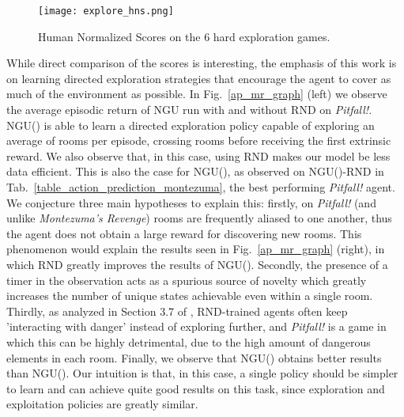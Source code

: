 \documentclass{article} \usepackage{iclr2020_conference,times}
\begin{document}
\begin{figure}
    \centering
    \texttt{[image: explore\_hns.png]} 
    \vspace{-2ex}
    \caption{Human Normalized Scores on the 6 hard exploration games.} 
    \label{hard_explore_hns_graph}
\vspace{-1ex}
\end{figure}

While direct comparison of the scores is interesting, the emphasis of this work is on learning directed exploration strategies that encourage the agent to cover as much of the environment as possible.
In Fig.~\ref{ap_mr_graph} (left) we observe the average episodic return of NGU run with and without RND on \textit{Pitfall!}. NGU() is able to learn a directed exploration policy capable of exploring an average of  rooms per episode, crossing  rooms before receiving the first extrinsic reward. We also observe that, in this case, using RND makes our model be less data efficient. This is also the case for NGU(), as observed on NGU()-RND in  Tab.~\ref{table_action_prediction_montezuma}, the best performing \textit{Pitfall!} agent. We conjecture three main hypotheses to explain this: firstly, on \textit{Pitfall!} (and unlike \textit{Montezuma's Revenge}) rooms are frequently aliased to one another, thus the agent does not obtain a large reward for discovering new rooms. This phenomenon would explain the results seen in Fig.~\ref{ap_mr_graph} (right), in which RND greatly improves the results of NGU(). Secondly, the presence of a timer in the observation acts as a spurious source of novelty which greatly increases the number of unique states achievable even within a single room. Thirdly, as analyzed in Section 3.7 of \cite{burda2018exploration}, RND-trained agents often keep 'interacting with danger' instead of exploring further, and \textit{Pitfall!} is a game in which this can be highly detrimental, due to the high amount of dangerous elements in each room.
Finally, we observe that NGU() obtains better results than NGU(). Our intuition is that, in this case, a single policy should be simpler to learn and can achieve quite good results on this task, since exploration and exploitation policies are greatly similar.
\end{document}
